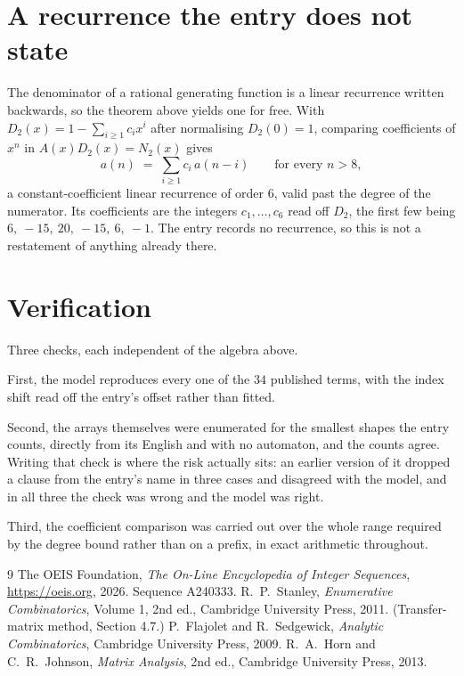 \documentclass[11pt,a4paper]{article}
\theoremstyle{plain}
\theoremstyle{definition}
\begin{document}
\section{A recurrence the entry does not state}

The denominator of a rational generating function is a linear recurrence written backwards, so
the theorem above yields one for free. With $D_2(x)=1-\sum_{i\ge1}c_ix^i$ after normalising
$D_2(0)=1$, comparing coefficients of $x^n$ in $A(x)D_2(x)=N_2(x)$ gives
\[
a(n)\;=\;\sum_{i\ge1}c_i\,a(n-i)\qquad\text{for every }n>8,
\]
a constant-coefficient linear recurrence of order $6$, valid past the degree of the
numerator. Its coefficients are the integers $c_1,\dots,c_{6}$ read off $D_2$, the first few being $6,\ -15,\ 20,\ -15,\ 6,\ -1$. The entry records no recurrence, so this is not a restatement of anything
already there.

\section{Verification}

Three checks, each independent of the algebra above.

First, the model reproduces every one of the $34$ published terms, with the index shift
read off the entry's offset rather than fitted.

Second, the arrays themselves were enumerated for the smallest shapes the entry counts,
directly from its English and with no automaton, and the counts agree. Writing that check is
where the risk actually sits: an earlier version of it dropped a clause from the entry's name
in three cases and disagreed with the model, and in all three the check was wrong and the model
was right.

Third, the coefficient comparison was carried out over the whole range required by the degree
bound rather than on a prefix, in exact arithmetic throughout.

\begin{thebibliography}{9}
 The OEIS Foundation, \emph{The On-Line Encyclopedia of Integer
Sequences}, \url{https://oeis.org}, 2026. Sequence A240333.
 R.~P.~Stanley, \emph{Enumerative Combinatorics}, Volume 1, 2nd ed.,
Cambridge University Press, 2011. (Transfer-matrix method, Section 4.7.)
 P.~Flajolet and R.~Sedgewick, \emph{Analytic Combinatorics}, Cambridge
University Press, 2009.
 R.~A.~Horn and C.~R.~Johnson, \emph{Matrix Analysis}, 2nd ed., Cambridge
University Press, 2013.
\end{thebibliography}
\end{document}
